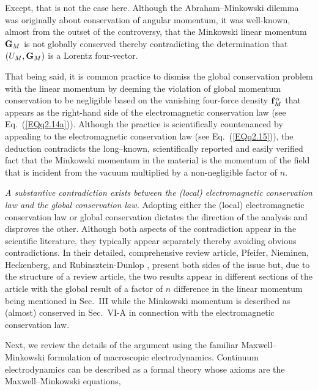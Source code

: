 \documentclass[twocolumn,amssymb,eqsecnum,aps,pra]{revtex4-2}
\begin{document}
Except, that is not the case here.
Although the Abraham--Minkowski dilemma was originally about
conservation of angular momentum, it was well-known, almost from the
outset of the controversy, that the Minkowski linear
momentum ${\bf G}_M$ is not globally conserved 
\cite{BIPfei,BIFofn1,BIFofn2,BIGord}
thereby contradicting the determination 
\cite{BIBrevCons,BIBrevik,BIWang4Vec}
that $(U_M,{\bf G}_M)$ is a Lorentz four-vector.
\par
That being said, it is common practice to dismiss the global
conservation problem with the linear momentum by deeming the
violation of global momentum conservation to be negligible based
on the vanishing four-force density ${\bf f}^{\alpha}_M$ that
appears as the right-hand side of the electromagnetic conservation
law (see Eq.~(\ref{EQq2.14a})).
Although the practice is scientifically countenanced by appealing to
the electromagnetic conservation law (see Eq.~(\ref{EQq2.15})), the
deduction contradicts the long--known, scientifically
reported \cite{BIPfei,BIFofn1,BIFofn2,BIGord} and easily verified
fact that the Minkowski momentum in the material is the 
momentum of the field that is incident from the vacuum 
multiplied by a non-negligible factor of $n$.
\par
\textit{A substantive contradiction exists between the
(local) electromagnetic conservation law and the global
conservation law.}
Adopting either the (local) electromagnetic conservation law or
global conservation dictates the direction of the analysis and
disproves the other.
Although both aspects of the contradiction appear in the scientific
literature, they typically appear separately thereby avoiding obvious
contradictions.
In their detailed, comprehensive review article,
Pfeifer, Nieminen, Heckenberg, and Rubinsztein-Dunlop \cite{BIPfei},
present both sides of the issue but, due to the structure of a
review article, the two results appear in different sections of
the article with the global result of a factor of $n$ difference
in the linear momentum being mentioned in Sec.~III while the
Minkowski momentum is described as (almost) conserved in Sec.~VI-A
in connection with the electromagnetic conservation law.
\par
Next, we review the details of the argument using the familiar
Maxwell--Minkowski formulation of macroscopic electrodynamics.
Continuum electrodynamics can be described as a formal theory
whose axioms are the Maxwell--Minkowski equations,
\end{document}
